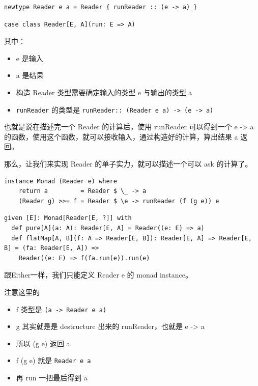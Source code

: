 \documentclass[letterspacing]{tufte-book}
\begin{document}
\lstset{language=haskell,label= ,caption= ,captionpos=b,numbers=none}
\begin{lstlisting}
newtype Reader e a = Reader { runReader :: (e -> a) }
\end{lstlisting}

\lstset{language=scala,label= ,caption= ,captionpos=b,numbers=none}
\begin{lstlisting}
case class Reader[E, A](run: E => A)
\end{lstlisting}

其中：
\begin{itemize}
\item e 是输入
\item a 是结果
\item 构造 Reader 类型需要确定输入的类型 e 与输出的类型 a
\item \texttt{runReader} 的类型是 \texttt{runReader:: (Reader e a) -> (e -> a)}
\end{itemize}

也就是说在描述完一个 Reader 的计算后，使用 runReader 可以得到一个 e -> a 的函数，使用这个函数，就可以接收输入，通过构造好的计算，算出结果 a 返回。

那么，让我们来实现 Reader 的单子实力，就可以描述一个可以 ask 的计算了。

\lstset{language=haskell,label= ,caption= ,captionpos=b,numbers=none}
\begin{lstlisting}
instance Monad (Reader e) where
    return a         = Reader $ \_ -> a
    (Reader g) >>= f = Reader $ \e -> runReader (f (g e)) e
\end{lstlisting}

\begin{verbatim}
given [E]: Monad[Reader[E, ?]] with
  def pure[A](a: A): Reader[E, A] = Reader((e: E) => a)
  def flatMap[A, B](f: A => Reader[E, B]): Reader[E, A] => Reader[E, B] = (fa: Reader[E, A]) =>
    Reader((e: E) => f(fa.run(e)).run(e)

\end{verbatim}

跟Either一样，我们只能定义 Reader e 的 monad instance。

注意这里的
\begin{itemize}
\item f 类型是 \texttt{(a -> Reader e a)}
\item g 其实就是是 destructure 出来的 runReader，也就是 e -> a
\item 所以 (g e) 返回 a
\item f (g e) 就是 \texttt{Reader e a}
\item 再 run 一把最后得到 a
\end{itemize}
\end{document}
